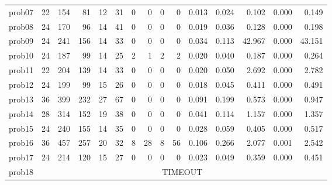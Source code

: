 \begin{table}[H]
{\begin{tabular}{lrrr rr rr rr rrrrr}
            prob07           & 22                                    & 154             & 81          & 12          & 31           & 0 & 0  & 0 & 0  & 0.013 & 0.024 & 0.102  & 0.000 & 0.149  \\
            prob08           & 24                                    & 170             & 96          & 14          & 41           & 0 & 0  & 0 & 0  & 0.019 & 0.036 & 0.128  & 0.000 & 0.198  \\
            prob09           & 24                                    & 241             & 156         & 14          & 33           & 0 & 0  & 0 & 0  & 0.034 & 0.113 & 42.967 & 0.000 & 43.151 \\
            prob10           & 24                                    & 187             & 99          & 14          & 25           & 2 & 1  & 2 & 2  & 0.020 & 0.040 & 0.187  & 0.000 & 0.264  \\
            prob11           & 22                                    & 204             & 139         & 14          & 33           & 0 & 0  & 0 & 0  & 0.020 & 0.050 & 2.692  & 0.000 & 2.782  \\
            prob12           & 24                                    & 199             & 99          & 15          & 26           & 0 & 0  & 0 & 0  & 0.018 & 0.045 & 0.411  & 0.000 & 0.491  \\
            prob13           & 36                                    & 399             & 232         & 27          & 67           & 0 & 0  & 0 & 0  & 0.091 & 0.199 & 0.573  & 0.000 & 0.947  \\
            prob14           & 28                                    & 314             & 152         & 19          & 38           & 0 & 0  & 0 & 0  & 0.041 & 0.114 & 1.157  & 0.000 & 1.357  \\
            prob15           & 24                                    & 240             & 155         & 14          & 35           & 0 & 0  & 0 & 0  & 0.028 & 0.059 & 0.405  & 0.000 & 0.517  \\
            prob16           & 36                                    & 457             & 257         & 20          & 32           & 8 & 28 & 8 & 56 & 0.106 & 0.266 & 2.077  & 0.001 & 2.542  \\
            prob17           & 24                                    & 214             & 120         & 15          & 27           & 0 & 0  & 0 & 0  & 0.023 & 0.049 & 0.359  & 0.000 & 0.451  \\
            prob18           & \multicolumn{14}{c}{TIMEOUT}                                                                                                                                   \\

\end{tabular}}
\end{table}

